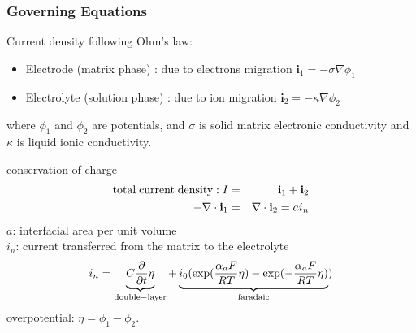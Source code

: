 \documentclass[10pt,xcolor=dvipsnames,compress]{beamer}
\begin{document}
\begin{frame}
\frametitle{Governing Equations}
\vfill

\begin{block}{}
Current density following Ohm's law:
\begin{itemize}
\item Electrode (matrix phase) : due to electrons migration
$
\mathbf{i}_1 = -\sigma\nabla\phi_1
$
\item Electrolyte (solution phase) : due to ion migration
$
\mathbf{i}_2 = -\kappa\nabla\phi_2
$
\end{itemize}
where $\phi_1$ and $\phi_2$ are potentials, and 
$\sigma$ is solid matrix electronic conductivity and $\kappa$ is liquid ionic conductivity.
\end{block}

\begin{block}{conservation of charge}
\vspace{-.2in}
\begin{eqnarray*}
{\rm total \; current \; density:} \; I & = & \mathbf{i}_1 + \mathbf{i}_2\\
-\nabla \cdot \mathbf{i}_1 & = & \nabla\cdot \mathbf{i}_2 = a {i}_n
\vspace{-.3in}
\end{eqnarray*}
$a$: interfacial area per unit volume \\
${i}_n$: current transferred from the matrix to the electrolyte
\begin{equation*}
{i}_n = \underbrace{C \frac{\partial}{\partial t} \eta}_{\rm double-layer}+
\underbrace{{i}_0 ( \exp (\frac{\alpha_aF}{RT}\eta) - \exp (-\frac{\alpha_aF}{RT}\eta)}_{\rm faradaic})
\end{equation*}
overpotential: 
$
\eta =  \phi_1 - \phi_2.
$
\end{block}

\vfill
\end{frame}
\end{document}
